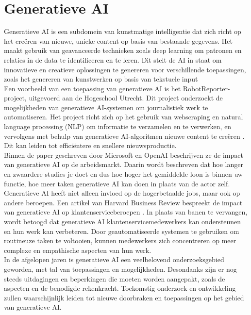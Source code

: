 \section{Generatieve AI}

Generatieve AI is een subdomein van kunstmatige intelligentie dat zich richt op het creëren van nieuwe, unieke content op basis van bestaande gegevens. Het maakt gebruik van geavanceerde technieken zoals deep learning om patronen en relaties in de data te identificeren en te leren. Dit stelt de AI in staat om innovatieve en creatieve oplossingen te genereren voor verschillende toepassingen, zoals het genereren van kunstwerken op basis van tekstuele input \autocite{SonixAI2021}\\

Een voorbeeld van een toepassing van generatieve AI is het RobotReporter-project, uitgevoerd aan de Hogeschool Utrecht. Dit project onderzoekt de mogelijkheden van generatieve AI-systemen om journalistiek werk te automatiseren. Het project richt zich op het gebruik van webscraping en natural language processing (NLP) om informatie te verzamelen en te verwerken, en vervolgens met behulp van generatieve AI-algoritmen nieuwe content te creëren \autocite{HU2021}. Dit kan leiden tot efficiëntere en snellere nieuwsproductie. \\

Binnen de paper geschreven door Microsoft en OpenAI beschrijven ze de impact van generatieve AI op de arbeidsmarkt. Daarin wordt beschreven dat hoe langer en zwaardere studies je doet en dus hoe hoger het gemiddelde loon is binnen uw functie, hoe meer taken generatieve AI kan doen in plaats van de actor zelf. \autocite{gpt_micai} \\ 

Generatieve AI heeft niet alleen invloed op de hogerbetaalde jobs, maar ook op andere beroepen. Een artikel van Harvard Business Review bespreekt de impact van generatieve AI op klantenserviceberoepen \autocite{HBR2023}. In plaats van banen te vervangen, wordt betoogd dat generatieve AI klantenservicemedewerkers kan ondersteunen en hun werk kan verbeteren. Door geautomatiseerde systemen te gebruiken om routineuze taken te voltooien, kunnen medewerkers zich concentreren op meer complexe en empathische aspecten van hun werk. \\

In de afgelopen jaren is generatieve AI een veelbelovend onderzoeksgebied geworden, met tal van toepassingen en mogelijkheden. Desondanks zijn er nog steeds uitdagingen en beperkingen die moeten worden aangepakt, zoals de  aspecten en de benodigde rekenkracht. Toekomstig onderzoek en ontwikkeling zullen waarschijnlijk leiden tot nieuwe doorbraken en toepassingen op het gebied van generatieve AI. \\

